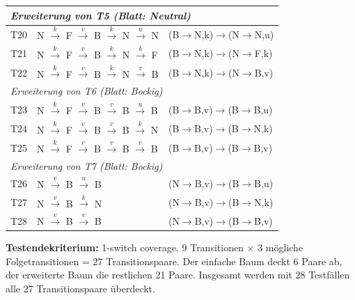 \documentclass[
	fontsize=12pt,          %
	paper=a4,               %
	numbers=noenddot,       %
	listof=totoc,           %
	listof=entryprefix,     %
	listof=nochaptergap,    %
	bibliography=totoc,     %
	parskip=half,           %
	openany                 %
]{scrbook}
\begin{document}
\begin{longtable}{| p{0.7cm} | p{7.0cm} | p{4.3cm} |}
	\multicolumn{3}{|l|}{\textit{Erweiterung von T5 (Blatt: Neutral)}} \\ \hline
	T20 & N $\xrightarrow{k}$ F $\xrightarrow{v}$ B $\xrightarrow{k}$ N $\xrightarrow{u}$ N & (B$\to$N,k)$\to$(N$\to$N,u) \\ \hline
	T21 & N $\xrightarrow{k}$ F $\xrightarrow{v}$ B $\xrightarrow{k}$ N $\xrightarrow{k}$ F & (B$\to$N,k)$\to$(N$\to$F,k) \\ \hline
	T22 & N $\xrightarrow{k}$ F $\xrightarrow{v}$ B $\xrightarrow{k}$ N $\xrightarrow{v}$ B & (B$\to$N,k)$\to$(N$\to$B,v) \\ \hline
	\multicolumn{3}{|l|}{\textit{Erweiterung von T6 (Blatt: Bockig)}} \\ \hline
	T23 & N $\xrightarrow{k}$ F $\xrightarrow{v}$ B $\xrightarrow{v}$ B $\xrightarrow{u}$ B & (B$\to$B,v)$\to$(B$\to$B,u) \\ \hline
	T24 & N $\xrightarrow{k}$ F $\xrightarrow{v}$ B $\xrightarrow{v}$ B $\xrightarrow{k}$ N & (B$\to$B,v)$\to$(B$\to$N,k) \\ \hline
	T25 & N $\xrightarrow{k}$ F $\xrightarrow{v}$ B $\xrightarrow{v}$ B $\xrightarrow{v}$ B & (B$\to$B,v)$\to$(B$\to$B,v) \\ \hline
	\multicolumn{3}{|l|}{\textit{Erweiterung von T7 (Blatt: Bockig)}} \\ \hline
	T26 & N $\xrightarrow{v}$ B $\xrightarrow{u}$ B & (N$\to$B,v)$\to$(B$\to$B,u) \\ \hline
	T27 & N $\xrightarrow{v}$ B $\xrightarrow{k}$ N & (N$\to$B,v)$\to$(B$\to$N,k) \\ \hline
	T28 & N $\xrightarrow{v}$ B $\xrightarrow{v}$ B & (N$\to$B,v)$\to$(B$\to$B,v) \\ \hline
\end{longtable}

\textbf{Testendekriterium:} 1-switch coverage.
9 Transitionen $\times$ 3 mögliche Folgetransitionen = 27 Transitionspaare.
Der einfache Baum deckt 6 Paare ab, der erweiterte Baum die restlichen 21 Paare.
Insgesamt werden mit 28 Testfällen alle 27 Transitionspaare überdeckt.

\end{document}
